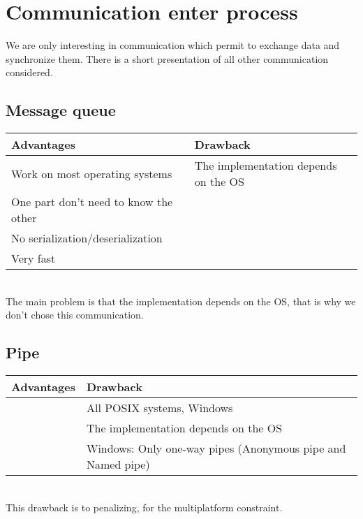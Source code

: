
\chapter{Communication enter process}
\label{annex:choice}


We are only interesting in communication which permit to exchange data and synchronize them. There is a short presentation of all other communication considered.

\section{Message queue}

\begin{tabular}{|p{}||p{}|}
\hline
  \textbf{Advantages} & \textbf{Drawback}\\
  \hline
  Work on most operating systems & The implementation depends on the OS\\
  \hline
  One part don't need to know the other &\\
  \hline
  No serialization/deserialization & \\
  \hline
  Very fast&\\
  \hline
\end{tabular}
~\\

The main problem is that the implementation depends on the OS, that is why we don't chose this communication.



\section{Pipe}

\begin{tabular}{|p{}||p{}|}
  \hline
  \textbf{Advantages}&\textbf{Drawback}\\
  \hline
                     &All POSIX systems, Windows\\
  \hline
                     &The implementation depends on the OS\\
  \hline
                     & Windows: Only one-way pipes (Anonymous pipe and Named pipe\cite{windows})\\
  \hline
\end{tabular}
~\\

This drawback is to penalizing, for the multiplatform constraint.

